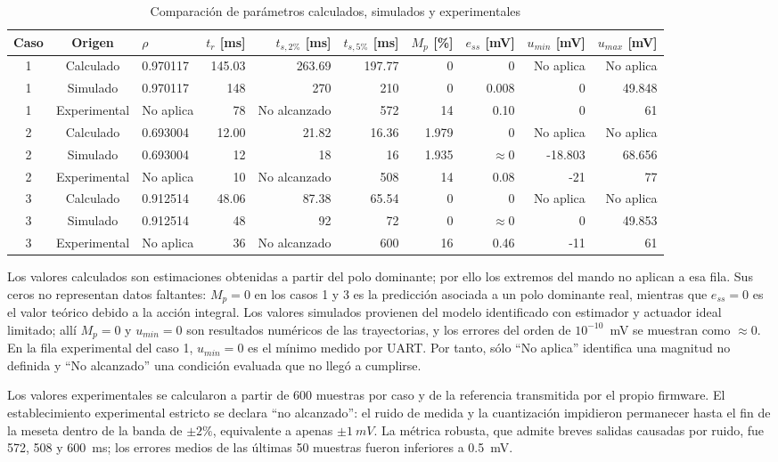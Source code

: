 \documentclass[conference]{IEEEtran}
\begin{document}
\begin{table}[!t]
\caption{Comparación de parámetros calculados, simulados y experimentales}
\label{tab:ideal}
\centering
\scriptsize
\begin{tabular}{cclrrrrrrr}
\toprule
Caso & Origen & $\rho$ & $t_r$ [ms] & $t_{s,2\%}$ [ms] & $t_{s,5\%}$ [ms] & $M_p$ [\%] & $e_{ss}$ [mV] & $u_{min}$ [mV] & $u_{max}$ [mV]\\
\midrule
1 & Calculado & 0.970117 & 145.03 & 263.69 & 197.77 & 0 & 0 & No aplica & No aplica\\
1 & Simulado & 0.970117 & 148 & 270 & 210 & 0 & 0.008 & 0 & 49.848\\
1 & Experimental & No aplica & 78 & No alcanzado & 572 & 14 & 0.10 & 0 & 61\\
\midrule
2 & Calculado & 0.693004 & 12.00 & 21.82 & 16.36 & 1.979 & 0 & No aplica & No aplica\\
2 & Simulado & 0.693004 & 12 & 18 & 16 & 1.935 & $\approx0$ & -18.803 & 68.656\\
2 & Experimental & No aplica & 10 & No alcanzado & 508 & 14 & 0.08 & -21 & 77\\
\midrule
3 & Calculado & 0.912514 & 48.06 & 87.38 & 65.54 & 0 & 0 & No aplica & No aplica\\
3 & Simulado & 0.912514 & 48 & 92 & 72 & 0 & $\approx0$ & 0 & 49.853\\
3 & Experimental & No aplica & 36 & No alcanzado & 600 & 16 & 0.46 & -11 & 61\\
\bottomrule
\end{tabular}
\end{table}

Los valores calculados son estimaciones obtenidas a partir del polo dominante; por ello los extremos del mando no aplican a esa fila. Sus ceros no representan datos faltantes: $M_p=0$ en los casos 1 y 3 es la predicción asociada a un polo dominante real, mientras que $e_{ss}=0$ es el valor teórico debido a la acción integral. Los valores simulados provienen del modelo identificado con estimador y actuador ideal limitado; allí $M_p=0$ y $u_{min}=0$ son resultados numéricos de las trayectorias, y los errores del orden de $10^{-10}$~mV se muestran como $\approx0$. En la fila experimental del caso 1, $u_{min}=0$ es el mínimo medido por UART. Por tanto, sólo ``No aplica'' identifica una magnitud no definida y ``No alcanzado'' una condición evaluada que no llegó a cumplirse.

Los valores experimentales se calcularon a partir de 600 muestras por caso y de la referencia transmitida por el propio firmware. El establecimiento experimental estricto se declara ``no alcanzado'': el ruido de medida y la cuantización impidieron permanecer hasta el fin de la meseta dentro de la banda de $\pm2\%$, equivalente a apenas $\pm\SI{1}{mV}$. La métrica robusta, que admite breves salidas causadas por ruido, fue 572, 508 y \SI{600}{ms}; los errores medios de las últimas 50 muestras fueron inferiores a \SI{0.5}{mV}.
\end{document}
